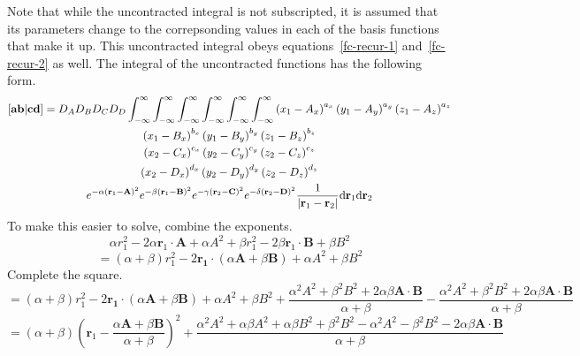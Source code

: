 Note that while the uncontracted integral is not subscripted, it is assumed that its parameters change to the correpsonding values in each of the basis functions that make it up. This uncontracted integral obeys equations~\ref{fc-recur-1} and~\ref{fc-recur-2} as well. The integral of the uncontracted functions has the following form.
\begin{multline}
  \left[\mathbf{ab}\middle|\mathbf{cd}\right] = D_A D_B D_C D_D \int_{-\infty}^\infty\int_{-\infty}^\infty\int_{-\infty}^\infty\int_{-\infty}^\infty\int_{-\infty}^\infty\int_{-\infty}^\infty \left(x_1 - A_x\right)^{a_x}\left(y_1 - A_y\right)^{a_y}\left(z_1 - A_z\right)^{a_z}\\
  \left(x_1 - B_x\right)^{b_x}\left(y_1 - B_y\right)^{b_y}\left(z_1 - B_z\right)^{b_z}\\
  \left(x_2 - C_x\right)^{c_x}\left(y_2 - C_y\right)^{c_y}\left(z_2 - C_z\right)^{c_z}\\
  \left(x_2 - D_x\right)^{d_x}\left(y_2 - D_y\right)^{d_y}\left(z_2 - D_z\right)^{d_z}\\
  e^{-\alpha \left(\mathbf{r}_1 - \mathbf{A}\right)^2} e^{-\beta \left(\mathbf{r}_1 - \mathbf{B}\right)^2} e^{-\gamma \left(\mathbf{r}_2 - \mathbf{C}\right)^2} e^{-\delta \left(\mathbf{r}_2 - \mathbf{D}\right)^2} \frac{1}{\left|\mathbf{r}_1 - \mathbf{r}_2\right|} \mathrm{d}\mathbf{r}_1 \mathrm{d}\mathbf{r}_2
\end{multline}
To make this easier to solve, combine the exponents.
\begin{equation}
  \alpha r_1^2 - 2\alpha \mathbf{r}_1 \cdot \mathbf{A} + \alpha A^2 + \beta r_1^2 - 2\beta \mathbf{r}_1 \cdot \mathbf{B} + \beta B^2
\end{equation}
\begin{equation}
  = \left(\alpha + \beta\right)r_1^2 - 2\mathbf{r_1} \cdot \left(\alpha\mathbf{A} + \beta\mathbf{B}\right) + \alpha A^2 + \beta B^2
\end{equation}
Complete the square.
\begin{equation}
  = \left(\alpha + \beta\right)r_1^2 - 2\mathbf{r_1} \cdot \left(\alpha\mathbf{A} + \beta\mathbf{B}\right) + \alpha A^2 + \beta B^2 + \frac{\alpha^2 A^2 + \beta^2 B^2 + 2\alpha\beta\mathbf{A} \cdot \mathbf{B}}{\alpha + \beta} - \frac{\alpha^2 A^2 + \beta^2 B^2 + 2\alpha\beta\mathbf{A} \cdot \mathbf{B}}{\alpha + \beta}
\end{equation}
\begin{equation}
  = \left(\alpha + \beta\right)\left(\mathbf{r}_1 - \frac{\alpha\mathbf{A} + \beta\mathbf{B}}{\alpha + \beta}\right)^2 + \frac{\alpha^2 A^2 + \alpha\beta A^2 + \alpha\beta B^2 + \beta^2B^2 - \alpha^2 A^2 - \beta^2 B^2 - 2\alpha\beta\mathbf{A}\cdot\mathbf{B}}{\alpha + \beta}
\end{equation}
